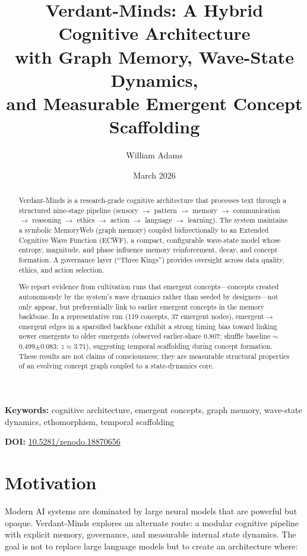 \documentclass[11pt,a4paper]{article}
\title{%
  \textbf{Verdant-Minds: A Hybrid Cognitive Architecture\\
  with Graph Memory, Wave-State Dynamics,\\
  and Measurable Emergent Concept Scaffolding}%
}
\author[1]{William Adams}
\affil[1]{Independent Researcher}
\date{March 2026}
\begin{document}
\maketitle

\begin{abstract}
Verdant-Minds is a research-grade cognitive architecture that processes text 
through a structured nine-stage pipeline (sensory $\to$ pattern $\to$ memory 
$\to$ communication $\to$ reasoning $\to$ ethics $\to$ action $\to$ language 
$\to$ learning). The system maintains a symbolic MemoryWeb (graph memory) 
coupled bidirectionally to an Extended Cognitive Wave Function (ECWF), a 
compact, configurable wave-state model whose entropy, magnitude, and phase 
influence memory reinforcement, decay, and concept formation. A governance 
layer (``Three Kings'') provides oversight across data quality, ethics, and 
action selection.

We report evidence from cultivation runs that emergent concepts---concepts 
created autonomously by the system's wave dynamics rather than seeded by 
designers---not only appear, but preferentially link to earlier emergent 
concepts in the memory backbone. In a representative run (119 concepts, 37 
emergent nodes), emergent$\to$emergent edges in a sparsified backbone exhibit 
a strong timing bias toward linking newer emergents to older emergents 
(observed earlier-share 0.807; shuffle baseline $\sim$0.499$\pm$0.083; 
$z \approx 3.71$), suggesting temporal scaffolding during concept formation. 
These results are not claims of consciousness; they are measurable structural 
properties of an evolving concept graph coupled to a state-dynamics core.
\end{abstract}

\vspace{1em}
\noindent\textbf{Keywords:} cognitive architecture, emergent concepts, graph memory, 
wave-state dynamics, ethomorphism, temporal scaffolding

\vspace{0.5em}
\noindent\textbf{DOI:} \href{https://doi.org/10.5281/zenodo.18870656}{10.5281/zenodo.18870656}

\section{Motivation}

Modern AI systems are dominated by large neural models that are powerful but 
opaque. Verdant-Minds explores an alternate route: a modular cognitive pipeline 
with explicit memory, governance, and measurable internal state dynamics. The 
goal is not to replace large language models but to create an architecture where:
\end{document}
